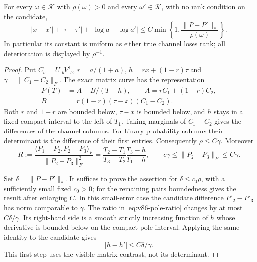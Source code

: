 \begin{theorem}
\label{thm:v86-product-modulus}
For every $\omega\in\mathcal K$ with $\rho(\omega)>0$ and every
$\omega'\in\mathcal K$, with no rank condition on the candidate,
\begin{equation}\label{eq:v86-modulus-bound}
 |x-x'|+|\tau-\tau'|+|\log a-\log a'|
       \le C\min\left\{1,\frac{\|P-P'\|_*}{\rho(\omega)}\right\}.
\end{equation}
In particular its constant is uniform as either true channel loses
rank; all deterioration is displayed by $\rho^{-1}$.
\end{theorem}
\begin{proof}
Put $C_b=U_{:b}V_{:b}^{\mathsf T}$,
$r=a/(1+a)$, $h=rx+(1-r)\tau$ and $\gamma=\|C_1-C_2\|_F$.
The exact matrix curve has the representation
\begin{align}
 P(T)&=A+B/(T-h),\qquad A=rC_1+(1-r)C_2,\nonumber\\
 B&=r(1-r)(\tau-x)(C_1-C_2).\label{eq:v86-matrix-pole}
\end{align}
Both $r$ and $1-r$ are bounded below, $\tau-x$ is bounded below,
and $h$ stays in a fixed compact interval to the left of $T_1$.
Taking marginals of $C_1-C_2$ gives the differences of the channel
columns. For binary probability columns their determinant is the
difference of their first entries. Consequently
$\rho\le C\gamma$. Moreover
\begin{equation}\label{eq:v86-pole-ratio}
 R:=\frac{\langle P_1-P_2,P_2-P_3\rangle_F}
                {\|P_2-P_3\|_F^2}
   =\frac{T_2-T_1}{T_3-T_2}\frac{T_3-h}{T_1-h},\qquad
       c\gamma\le\|P_2-P_3\|_F\le C\gamma.
\end{equation}

Set $\delta=\|P-P'\|_*$. It suffices to prove the assertion for
$\delta\le c_0\rho$, with a sufficiently small fixed $c_0>0$;
for the remaining pairs boundedness gives the result after enlarging
$C$. In this small-error case the candidate difference $P'_2-P'_3$
has norm comparable to $\gamma$. The ratio in
\eqref{eq:v86-pole-ratio} changes by at most $C\delta/\gamma$.
Its right-hand side is a smooth strictly increasing function of $h$
whose derivative is bounded below on the compact pole interval.
Applying the same identity to the candidate gives
\begin{equation}\label{eq:v86-pole-error}
                         |h-h'|\le C\delta/\gamma.
\end{equation}
This first step uses the visible matrix contrast, not its determinant.


\end{proof}
